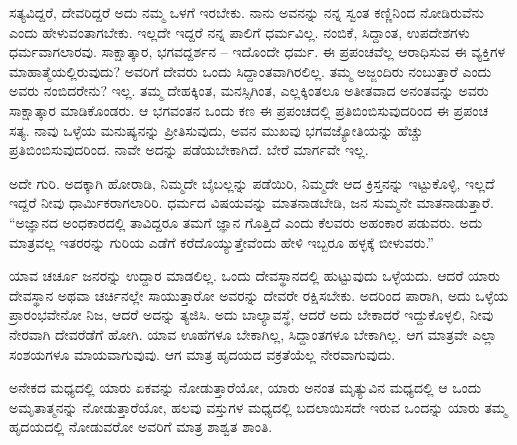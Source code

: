 ಸತ್ಯವಿದ್ದರೆ, ದೇವರಿದ್ದರೆ ಅದು ನಮ್ಮ ಒಳಗೆ ಇರಬೇಕು. ನಾನು ಅವನನ್ನು ನನ್ನ ಸ್ವಂತ ಕಣ್ಣಿನಿಂದ ನೋಡಿರುವೆನು ಎಂದು ಹೇಳುವಂತಾಗಬೇಕು. ಇಲ್ಲದೇ ಇದ್ದರೆ ನನ್ನ ಪಾಲಿಗೆ ಧರ್ಮವಿಲ್ಲ. ನಂಬಿಕೆ, ಸಿದ್ದಾಂತ, ಉಪದೇಶಗಳು ಧರ್ಮವಾಗಲಾರವು. ಸಾಕ್ಷಾತ್ಕಾರ, ಭಗವದ್ದರ್ಶನ – ಇದೊಂದೇ ಧರ್ಮ. ಈ ಪ್ರಪಂಚವೆಲ್ಲ ಆರಾಧಿಸುವ ಈ ವ್ಯಕ್ತಿಗಳ ಮಾಹಾತ್ಮೆಯಲ್ಲಿರುವುದು? ಅವರಿಗೆ ದೇವರು ಒಂದು ಸಿದ್ದಾಂತವಾಗಿರಲಿಲ್ಲ. ತಮ್ಮ ಅಜ್ಜಂದಿರು ನಂಬುತ್ತಾರೆ ಎಂದು ಅವರು ನಂಬಿದರೇನು? ಇಲ್ಲ. ತಮ್ಮ ದೇಹಕ್ಕಿಂತ, ಮನಸ್ಸಿಗಿಂತ, ಎಲ್ಲಕ್ಕಿಂತಲೂ ಅತೀತವಾದ ಅನಂತವನ್ನು ಅವರು ಸಾಕ್ಷಾತ್ಕಾರ ಮಾಡಿಕೊಂಡರು. ಆ ಭಗವಂತನ ಒಂದು ಕಣ ಈ ಪ್ರಪಂಚದಲ್ಲಿ ಪ್ರತಿಬಿಂಬಿಸುವುದರಿಂದ ಈ ಪ್ರಪಂಚ ಸತ್ಯ. ನಾವು ಒಳ್ಳೆಯ ಮನುಷ್ಯನನ್ನು ಪ್ರೀತಿಸುವುದು, ಅವನ ಮುಖವು ಭಗವಜ್ಯೋತಿಯನ್ನು ಹೆಚ್ಚು ಪ್ರತಿಬಿಂಬಿಸುವುದರಿಂದ. ನಾವೇ ಅದನ್ನು ಪಡೆಯಬೇಕಾಗಿದೆ. ಬೇರೆ ಮಾರ್ಗವೇ ಇಲ್ಲ.

ಅದೇ ಗುರಿ. ಅದಕ್ಕಾಗಿ ಹೋರಾಡಿ, ನಿಮ್ಮದೇ ಬೈಬಲ್ಲನ್ನು ಪಡೆಯಿರಿ, ನಿಮ್ಮದೇ ಆದ ಕ್ರಿಸ್ತನನ್ನು ಇಟ್ಟುಕೊಳ್ಳಿ, ಇಲ್ಲದೆ ಇದ್ದರೆ ನೀವು ಧಾರ್ಮಿಕರಾಗಲಾರಿರಿ. ಧರ್ಮದ ವಿಷಯವನ್ನು ಮಾತನಾಡಬೇಡಿ, ಜನ ಸುಮ್ಮನೇ ಮಾತನಾಡುತ್ತಾರೆ. “ಅಜ್ಞಾನದ ಅಂಧಕಾರದಲ್ಲಿ ತಾವಿದ್ದರೂ ತಮಗೆ ಜ್ಞಾನ ಗೊತ್ತಿದೆ ಎಂದು ಕೆಲವರು ಅಹಂಕಾರ ಪಡುವರು. ಅದು ಮಾತ್ರವಲ್ಲ ಇತರರನ್ನು ಗುರಿಯ ಎಡೆಗೆ ಕರೆದೊಯ್ಯುತ್ತೇವೆಂದು ಹೇಳಿ ಇಬ್ಬರೂ ಹಳ್ಳಕ್ಕೆ ಬೀಳುವರು.”

ಯಾವ ಚರ್ಚೂ ಜನರನ್ನು ಉದ್ದಾರ ಮಾಡಲಿಲ್ಲ. ಒಂದು ದೇವಸ್ಥಾನದಲ್ಲಿ ಹುಟ್ಟುವುದು ಒಳ್ಳೆಯದು. ಆದರೆ ಯಾರು ದೇವಸ್ಥಾನ ಅಥವಾ ಚರ್ಚಿನಲ್ಲೇ ಸಾಯುತ್ತಾರೋ ಅವರನ್ನು ದೇವರೇ ರಕ್ಷಿಸಬೇಕು. ಅದರಿಂದ ಪಾರಾಗಿ, ಅದು ಒಳ್ಳೆಯ ಪ್ರಾರಂಭವೇನೋ ನಿಜ, ಆದರೆ ಅದನ್ನು ತ್ಯಜಿಸಿ. ಅದು ಬಾಲ್ಯಾವಸ್ಥೆ, ಆದರೆ ಅದು ಬೇಕಾದರೆ ಇದ್ದುಕೊಳ್ಳಲಿ, ನೀವು ನೇರವಾಗಿ ದೇವರೆಡೆಗೆ ಹೋಗಿ. ಯಾವ ಊಹೆಗಳೂ ಬೇಕಾಗಿಲ್ಲ, ಸಿದ್ದಾಂತಗಳೂ ಬೇಕಾಗಿಲ್ಲ. ಆಗ ಮಾತ್ರವೇ ಎಲ್ಲಾ ಸಂಶಯಗಳೂ ಮಾಯವಾಗುವುವು. ಆಗ ಮಾತ್ರ ಹೃದಯದ ವಕ್ರತೆಯೆಲ್ಲ ನೇರವಾಗುವುದು.

ಅನೇಕದ ಮಧ್ಯದಲ್ಲಿ ಯಾರು ಏಕವನ್ನು ನೋಡುತ್ತಾರೆಯೋ, ಯಾರು ಅನಂತ ಮೃತ್ಯುವಿನ ಮಧ್ಯದಲ್ಲಿ ಆ ಒಂದು ಅಮೃತಾತ್ಮನನ್ನು ನೋಡುತ್ತಾರೆಯೋ, ಹಲವು ವಸ್ತುಗಳ ಮಧ್ಯದಲ್ಲಿ ಬದಲಾಯಿಸದೇ ಇರುವ ಒಂದನ್ನು ಯಾರು ತಮ್ಮ ಹೃದಯದಲ್ಲಿ ನೋಡುವರೋ ಅವರಿಗೆ ಮಾತ್ರ ಶಾಶ್ವತ ಶಾಂತಿ.

